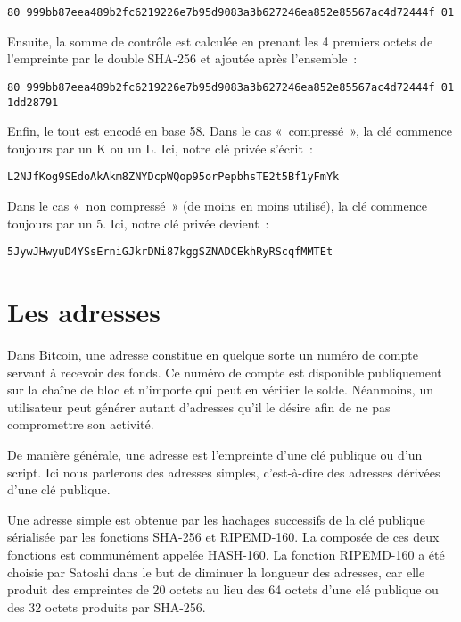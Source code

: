 \begin{Verbatim}[fontsize=\footnotesize]
80 999bb87eea489b2fc6219226e7b95d9083a3b627246ea852e85567ac4d72444f 01
\end{Verbatim}

Ensuite, la somme de contrôle est calculée en prenant les 4 premiers octets de l'empreinte par le double SHA-256 et ajoutée après l'ensemble~:


\begin{Verbatim}[fontsize=\footnotesize]
80 999bb87eea489b2fc6219226e7b95d9083a3b627246ea852e85567ac4d72444f 01
1dd28791
\end{Verbatim}

Enfin, le tout est encodé en base 58. Dans le cas «~compressé~», la clé commence toujours par un K ou un L. Ici, notre clé privée s'écrit~:

\begin{Verbatim}[fontsize=\footnotesize]
L2NJfKog9SEdoAkAkm8ZNYDcpWQop95orPepbhsTE2t5Bf1yFmYk
\end{Verbatim}

Dans le cas «~non compressé~» (de moins en moins utilisé), la clé commence toujours par un 5. Ici, notre clé privée devient~:

\begin{Verbatim}[fontsize=\footnotesize]
5JywJHwyuD4YSsErniGJkrDNi87kggSZNADCEkhRyRScqfMMTEt
\end{Verbatim}

\section{Les adresses}

Dans Bitcoin, une adresse constitue en quelque sorte un numéro de compte servant à recevoir des fonds. Ce numéro de compte est disponible publiquement sur la chaîne de bloc et n'importe qui peut en vérifier le solde. Néanmoins, un utilisateur peut générer autant d'adresses qu'il le désire afin de ne pas compromettre son activité.

De manière générale, une adresse est l'empreinte d'une clé publique ou d'un script. Ici nous parlerons des adresses simples, c'est-à-dire des adresses dérivées d'une clé publique.

Une adresse simple est obtenue par les hachages successifs de la clé publique sérialisée par les fonctions SHA-256 et RIPEMD-160. La composée de ces deux fonctions est communément appelée HASH-160. La fonction RIPEMD-160 a été choisie par Satoshi dans le but de diminuer la longueur des adresses, car elle produit des empreintes de 20 octets au lieu des 64 octets d'une clé publique ou des 32 octets produits par SHA-256.

